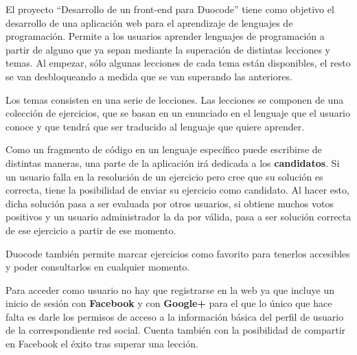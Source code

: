 El proyecto ``Desarrollo de un front-end para Duocode'' tiene como objetivo el desarrollo de una aplicación web para el aprendizaje de lenguajes de programación. Permite a los usuarios aprender lenguajes de programación a partir de alguno que ya sepan mediante la superación de distintas lecciones y temas. Al empezar, sólo algunas lecciones de cada tema están disponibles, el resto se van desbloqueando a medida que se van superando las anteriores.

Los temas consisten en una serie de lecciones. Las lecciones se componen de una colección de ejercicios, que se basan en un enunciado en el lenguaje que el usuario conoce y que tendrá que ser traducido al lenguaje que quiere aprender.

Como un fragmento de código en un lenguaje específico puede escribirse de distintas maneras, una parte de la aplicación irá dedicada a los \textbf{candidatos}. Si un usuario falla en la resolución de un ejercicio pero cree que su solución es correcta, tiene la posibilidad de enviar su ejercicio como candidato. Al hacer esto, dicha solución pasa a ser evaluada por otros usuarios, si obtiene muchos votos positivos y un usuario administrador la da por válida, pasa a ser solución correcta de ese ejercicio a partir de ese momento.

Duocode también permite marcar ejercicios como favorito para tenerlos accesibles y poder consultarlos en cualquier momento.

Para acceder como usuario no hay que registrarse en la web ya que incluye un inicio de sesión con \textbf{Facebook} y con \textbf{Google+} para el que lo único que hace falta es darle los permisos de acceso a la información básica del perfil de usuario de la correspondiente red social. Cuenta también con la posibilidad de compartir en Facebook el éxito tras superar una lección.

 

